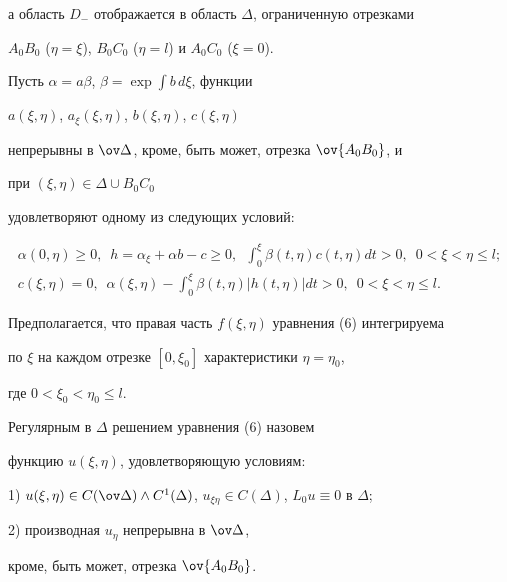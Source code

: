 а область $D_-$ отображается в область $\Delta$, ограниченную отрезками 


$A_0B_0$ ($\eta=\xi$), $B_0C_0$ ($\eta=l$) и $A_0C_0$ ($\xi=0$). 


 


Пусть $\alpha=a\beta$, $\beta=\exp\displaystyle\int b\,d\xi$, функции 


$a(\xi,\eta)$, $a_\xi(\xi,\eta)$, $b(\xi,\eta)$, $c(\xi,\eta)$ 


непрерывны в $\ov\Delta$, кроме, быть может, отрезка $\ov{A_0B_0}$, и 


при $(\xi,\eta)\in\Delta\cup B_0C_0$ 


удовлетворяют одному из следующих условий: 


\begin{gather} 


\alpha(0,\eta)\ge0,\ \; h=\alpha_\xi+\alpha b-c\ge0,\ \; 


\int^\xi_0 \beta(t,\eta)c(t,\eta)dt>0, \ \; 0<\xi<\eta\le l; 


\tag{$B_1$} \\ 


% 


c(\xi,\eta)=0,\ \; \alpha(\xi,\eta)-\int^\xi_0 \beta(t,\eta) 


|h(t,\eta)|dt>0,\ \; 0<\xi<\eta\le l.\tag{$B_2$} 


\end{gather} 


Предполагается, что правая часть $f(\xi,\eta)$ уравнения (6) интегрируема 


по $\xi$ на каждом отрезке $[0,\xi_0]$ характеристики $\eta=\eta_0$, 


где $0<\xi_0<\eta_0\le l$. 


 


\begin{defn} 


Регулярным в $\Delta$ решением уравнения (6) назовем 


функцию $u(\xi,\eta)$, удовлетворяющую условиям: 


 


1) $u(\xi,\eta)\in C(\ov\Delta)\wedge C^1(\Delta)$, $u_{\xi\eta}\in 


C(\Delta)$, $L_0u\equiv0$ в $\Delta$; 


 


2) производная $u_\eta$ непрерывна в $\ov\Delta$, 


кроме, быть может, отрезка $\ov{A_0B_0}$. 


\end{defn} 


